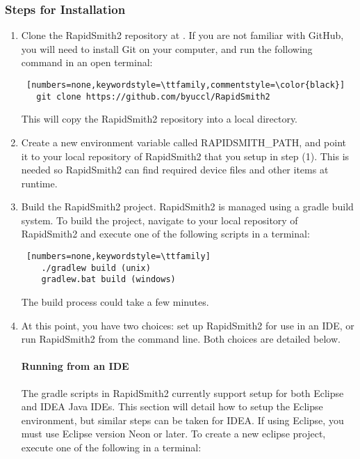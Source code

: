 \subsubsection{Steps for Installation}

\begin{enumerate}
  \item Clone the RapidSmith2 repository at
  {}. If you are not
  familiar with GitHub, you will need to install Git on your computer, and run the
  following command in an open terminal: 

\begin{lstlisting} [numbers=none,keywordstyle=\ttfamily,commentstyle=\color{black}] 
   git clone https://github.com/byuccl/RapidSmith2
\end{lstlisting}
 
  \noindent This will copy the RapidSmith2 repository into a local directory.
  \item Create a new environment variable called RAPIDSMITH\_PATH, and point it
  to your local repository of RapidSmith2 that you setup in step (1). This is needed so
  RapidSmith2 can find required device files and other items at runtime.
  \item Build the  RapidSmith2 project. RapidSmith2 is managed using a gradle build system.
  To build the project, navigate to your local repository of RapidSmith2 and execute one
  of the following scripts in a terminal:
  
\begin{lstlisting} [numbers=none,keywordstyle=\ttfamily]
	./gradlew build (unix)
	gradlew.bat build (windows)
\end{lstlisting}
  
  The build process could take a few minutes.
  \item At this point, you have two choices: set up RapidSmith2 for use in an IDE, or
  run RapidSmith2 from the command line. Both choices are detailed below.
  \paragraph{Running from an IDE} The gradle scripts in RapidSmith2 currently support
  setup for both Eclipse and IDEA Java IDEs. This section will detail how to
  setup the Eclipse environment, but similar steps can be taken for IDEA. If
  using Eclipse, you must use Eclipse version Neon or later. To
  create a new eclipse project, execute one of the following in a terminal:
  

\end{enumerate}
